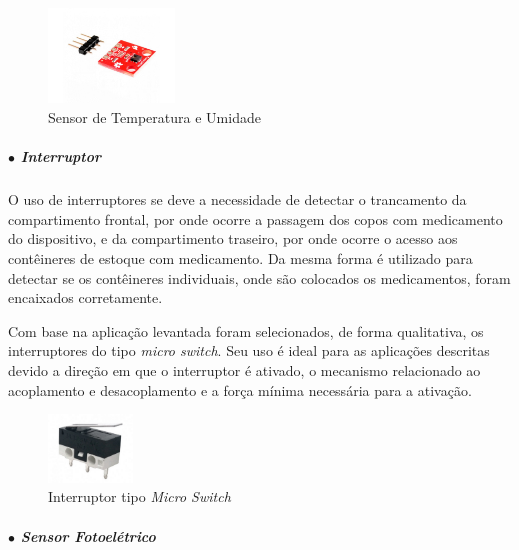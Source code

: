     \begin{figure}[H]
        \centering
        \includegraphics[width=0.3\textwidth]{figuras/sensor_temp_umi.jpg}
        \caption{Sensor de Temperatura e Umidade}
        \label{fig:sensor_temp_umidade}
    \end{figure}

    \subparagraph*{$\bullet$ Interruptor} \hfill
    
    O uso de interruptores se deve a necessidade de detectar o trancamento da compartimento frontal, por onde ocorre a passagem dos copos com medicamento do dispositivo, e da compartimento traseiro, por onde ocorre o acesso aos contêineres de estoque com medicamento. Da mesma forma é utilizado para detectar se os contêineres individuais, onde são colocados os medicamentos, foram encaixados corretamente.
    
    
    Com base na aplicação levantada foram selecionados, de forma qualitativa, os interruptores do tipo \textit{micro switch}. Seu uso é ideal para as aplicações descritas devido a direção em que o interruptor é ativado, o mecanismo relacionado ao acoplamento e desacoplamento e a força mínima necessária para a ativação. 
    
    \begin{figure}[H]
        \centering
        \includegraphics[width=0.2\textwidth]{figuras/microswitch.png}
        \caption{Interruptor tipo \textit{Micro Switch}}
        \label{fig:micro_switch}
    \end{figure}
    
    
    \subparagraph*{$\bullet$ Sensor Fotoelétrico} \hfill
    

